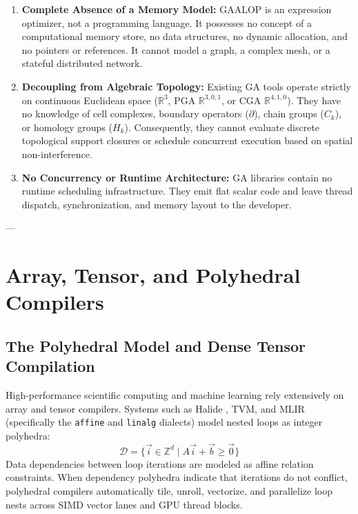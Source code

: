 \begin{enumerate}[leftmargin=1.2cm]
    \item \textbf{Complete Absence of a Memory Model:}  
    GAALOP is an expression optimizer, not a programming language. It possesses no concept of a computational memory store, no data structures, no dynamic allocation, and no pointers or references. It cannot model a graph, a complex mesh, or a stateful distributed network.

    \item \textbf{Decoupling from Algebraic Topology:}  
    Existing GA tools operate strictly on continuous Euclidean space ($\mathbb{R}^3$, PGA $\mathbb{R}^{3,0,1}$, or CGA $\mathbb{R}^{4,1,0}$). They have no knowledge of cell complexes, boundary operators ($\partial$), chain groups ($C_k$), or homology groups ($H_k$). Consequently, they cannot evaluate discrete topological support closures or schedule concurrent execution based on spatial non-interference.

    \item \textbf{No Concurrency or Runtime Architecture:}  
    GA libraries contain no runtime scheduling infrastructure. They emit flat scalar code and leave thread dispatch, synchronization, and memory layout to the developer.
\end{enumerate}

---

\section{Array, Tensor, and Polyhedral Compilers}
\label{sec:tensor_polyhedral}

\subsection{The Polyhedral Model and Dense Tensor Compilation}
High-performance scientific computing and machine learning rely extensively on array and tensor compilers. Systems such as Halide \cite{ragan2013halide}, TVM, and MLIR (specifically the \texttt{affine} and \texttt{linalg} dialects) \cite{lattner2021mlir} model nested loops as integer polyhedra:
\begin{equation}
    \mathcal{D} = \{ \vec{i} \in \mathbb{Z}^d \mid A \vec{i} + \vec{b} \ge \vec{0} \}
\end{equation}
Data dependencies between loop iterations are modeled as affine relation constraints. When dependency polyhedra indicate that iterations do not conflict, polyhedral compilers automatically tile, unroll, vectorize, and parallelize loop nests across SIMD vector lanes and GPU thread blocks.

